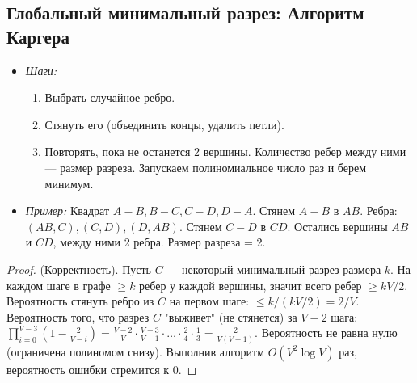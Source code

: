 \documentclass[12pt, a4paper]{article}
\begin{document}
\subsection{Глобальный минимальный разрез: Алгоритм Каргера}
\begin{itemize}
    \item \textit{Шаги:}
    \begin{enumerate}
        \item Выбрать случайное ребро.
        \item Стянуть его (объединить концы, удалить петли).
        \item Повторять, пока не останется 2 вершины. Количество ребер между ними --- размер разреза. Запускаем полиномиальное число раз и берем минимум.
    \end{enumerate}
    \item \textit{Пример:} Квадрат $A-B, B-C, C-D, D-A$. Стянем $A-B$ в $AB$. Ребра: $(AB, C), (C, D), (D, AB)$. Стянем $C-D$ в $CD$. Остались вершины $AB$ и $CD$, между ними 2 ребра. Размер разреза = 2.
\end{itemize}
\begin{proof}
(Корректность). Пусть $C$ --- некоторый минимальный разрез размера $k$. На каждом шаге в графе $\ge k$ ребер у каждой вершины, значит всего ребер $\ge kV/2$. Вероятность стянуть ребро из $C$ на первом шаге: $\le k / (kV/2) = 2/V$. Вероятность того, что разрез $C$ "выживет" (не стянется) за $V-2$ шага:
$\prod_{i=0}^{V-3} \left(1 - \frac{2}{V-i}\right) = \frac{V-2}{V} \cdot \frac{V-3}{V-1} \cdot \dots \cdot \frac{2}{4} \cdot \frac{1}{3} = \frac{2}{V(V-1)}$.
Вероятность не равна нулю (ограничена полиномом снизу). Выполнив алгоритм $O(V^2 \log V)$ раз, вероятность ошибки стремится к 0.
\end{proof}
\end{document}
